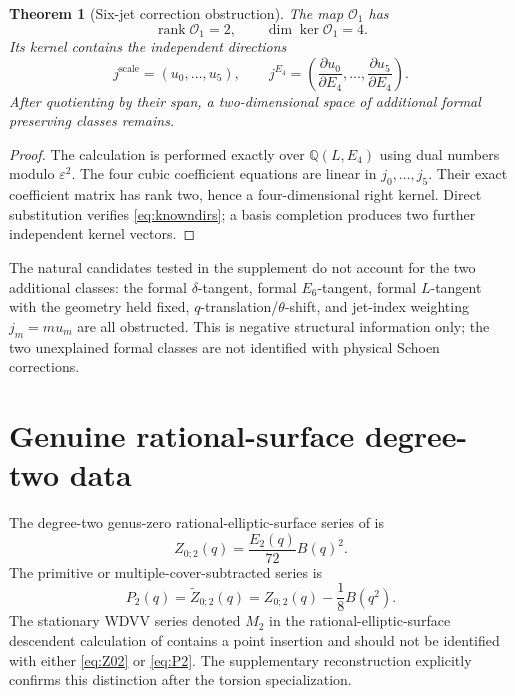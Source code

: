 \documentclass[11pt]{article}
\newtheorem{theorem}{Theorem}[section]
\theoremstyle{definition}
\theoremstyle{remark}
\newcommand{\Q}{\mathbb{Q}}
\newcommand{\cO}{\mathcal{O}}
\newcommand{\rank}{\operatorname{rank}}
\newcommand{\kerop}{\operatorname{ker}}
\begin{document}
\begin{theorem}[Six-jet correction obstruction]\label{thm:correctionkernel}
The map \(\cO_1\) has
\begin{equation}\label{eq:ranknullity}
 \rank\cO_1=2,
 \qquad
 \dim\kerop\cO_1=4.
\end{equation}
Its kernel contains the independent directions
\begin{equation}\label{eq:knowndirs}
 j^{\mathrm{scale}}=(u_0,\ldots,u_5),
 \qquad
 j^{E_4}=\left(\frac{\partial u_0}{\partial E_4},\ldots,
 \frac{\partial u_5}{\partial E_4}\right).
\end{equation}
After quotienting by their span, a two-dimensional space of additional formal preserving classes remains.
\end{theorem}

\begin{proof}
The calculation is performed exactly over \(\Q(L,E_4)\) using dual numbers modulo \(\varepsilon^2\).  The four cubic coefficient equations are linear in \(j_0,\ldots,j_5\).  Their exact coefficient matrix has rank two, hence a four-dimensional right kernel.  Direct substitution verifies \eqref{eq:knowndirs}; a basis completion produces two further independent kernel vectors.
\end{proof}

The natural candidates tested in the supplement do not account for the two additional classes: the formal \(\delta\)-tangent, formal \(E_6\)-tangent, formal \(L\)-tangent with the geometry held fixed, \(q\)-translation/\(\theta\)-shift, and jet-index weighting \(j_m=mu_m\) are all obstructed.  This is negative structural information only; the two unexplained formal classes are not identified with physical Schoen corrections.

\section{Genuine rational-surface degree-two data}

The degree-two genus-zero rational-elliptic-surface series of \cite{HST} is
\begin{equation}\label{eq:Z02}
 Z_{0;2}(q)=\frac{E_2(q)}{72}B(q)^2.
\end{equation}
The primitive or multiple-cover-subtracted series is
\begin{equation}\label{eq:P2}
 P_2(q)=\widetilde Z_{0;2}(q)
 =Z_{0;2}(q)-\frac18B(q^2).
\end{equation}
The stationary WDVV series denoted \(M_2\) in the rational-elliptic-surface descendent calculation of \cite{OP} contains a point insertion and should not be identified with either \eqref{eq:Z02} or \eqref{eq:P2}.  The supplementary reconstruction explicitly confirms this distinction after the torsion specialization.
\end{document}
